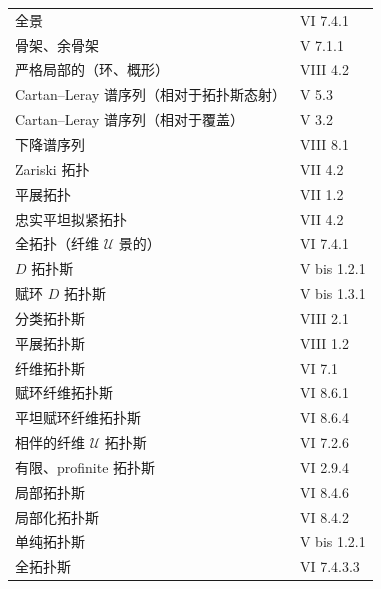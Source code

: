 \begin{longtable}{p{}p{}}
全景 & VI 7.4.1\\
骨架、余骨架 & V 7.1.1\\
严格局部的（环、概形） & VIII 4.2\\
Cartan--Leray 谱序列（相对于拓扑斯态射） & V 5.3\\
Cartan--Leray 谱序列（相对于覆盖） & V 3.2\\
下降谱序列 & VIII 8.1\\
Zariski 拓扑 & VII 4.2\\
平展拓扑 & VII 1.2\\
忠实平坦拟紧拓扑 & VII 4.2\\
全拓扑（纤维 $\mathcal U$ 景的） & VI 7.4.1\\
$D$ 拓扑斯 & V bis 1.2.1\\
赋环 $D$ 拓扑斯 & V bis 1.3.1\\
分类拓扑斯 & VIII 2.1\\
平展拓扑斯 & VIII 1.2\\
纤维拓扑斯 & VI 7.1\\
赋环纤维拓扑斯 & VI 8.6.1\\
平坦赋环纤维拓扑斯 & VI 8.6.4\\
相伴的纤维 $\mathcal U$ 拓扑斯 & VI 7.2.6\\
有限、profinite 拓扑斯 & VI 2.9.4\\
局部拓扑斯 & VI 8.4.6\\
局部化拓扑斯 & VI 8.4.2\\
单纯拓扑斯 & V bis 1.2.1\\
全拓扑斯 & VI 7.4.3.3\\
\end{longtable}
